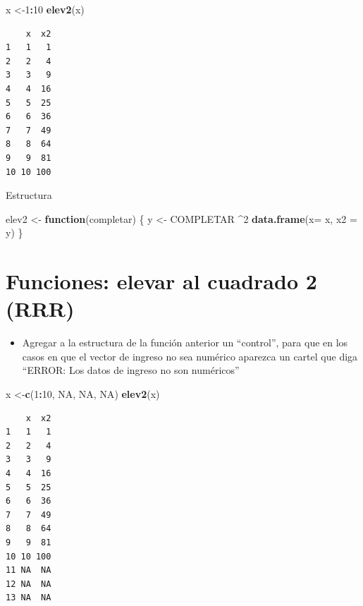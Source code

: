 \documentclass[]{book}
\newenvironment{Shaded}{\begin{snugshade}}{\end{snugshade}}
\newcommand{\ControlFlowTok}[1]{\textcolor[rgb]{0.13,0.29,0.53}{\textbf{#1}}}
\newcommand{\DataTypeTok}[1]{\textcolor[rgb]{0.13,0.29,0.53}{#1}}
\newcommand{\DecValTok}[1]{\textcolor[rgb]{0.00,0.00,0.81}{#1}}
\newcommand{\KeywordTok}[1]{\textcolor[rgb]{0.13,0.29,0.53}{\textbf{#1}}}
\newcommand{\NormalTok}[1]{#1}
\newcommand{\OperatorTok}[1]{\textcolor[rgb]{0.81,0.36,0.00}{\textbf{#1}}}
\newcommand{\OtherTok}[1]{\textcolor[rgb]{0.56,0.35,0.01}{#1}}
\newcommand{\StringTok}[1]{\textcolor[rgb]{0.31,0.60,0.02}{#1}}
\providecommand{\tightlist}{%
  \setlength{\itemsep}{0pt}\setlength{\parskip}{0pt}}
\begin{document}
\begin{Shaded}
\begin{Highlighting}[]
\NormalTok{  x <-}\DecValTok{1}\OperatorTok{:}\DecValTok{10}
  \KeywordTok{elev2}\NormalTok{(x) }
\end{Highlighting}
\end{Shaded}

\begin{verbatim}
    x  x2
1   1   1
2   2   4
3   3   9
4   4  16
5   5  25
6   6  36
7   7  49
8   8  64
9   9  81
10 10 100
\end{verbatim}

Estructura

\begin{Shaded}
\begin{Highlighting}[]
\NormalTok{elev2 <-}\StringTok{ }\ControlFlowTok{function}\NormalTok{(completar) \{}
\NormalTok{  y <-}\StringTok{ }\NormalTok{COMPLETAR }\OperatorTok{^}\DecValTok{2}
  \KeywordTok{data.frame}\NormalTok{(}\DataTypeTok{x=}\NormalTok{ x, }\DataTypeTok{x2 =}\NormalTok{ y)}
\NormalTok{  \}}
\end{Highlighting}
\end{Shaded}

\hypertarget{funciones-elevar-al-cuadrado-2-rrr}{%
\section{Funciones: elevar al cuadrado 2 (RRR)}\label{funciones-elevar-al-cuadrado-2-rrr}}

\begin{itemize}
\tightlist
\item
  Agregar a la estructura de la función anterior un ``control'', para que en los casos en que el vector de ingreso no sea numérico aparezca un cartel que diga ``ERROR: Los datos de ingreso no son numéricos''
\end{itemize}

\begin{Shaded}
\begin{Highlighting}[]
\NormalTok{  x <-}\KeywordTok{c}\NormalTok{(}\DecValTok{1}\OperatorTok{:}\DecValTok{10}\NormalTok{, }\OtherTok{NA}\NormalTok{, }\OtherTok{NA}\NormalTok{, }\OtherTok{NA}\NormalTok{)}
  \KeywordTok{elev2}\NormalTok{(x) }
\end{Highlighting}
\end{Shaded}

\begin{verbatim}
    x  x2
1   1   1
2   2   4
3   3   9
4   4  16
5   5  25
6   6  36
7   7  49
8   8  64
9   9  81
10 10 100
11 NA  NA
12 NA  NA
13 NA  NA
\end{verbatim}
\end{document}
